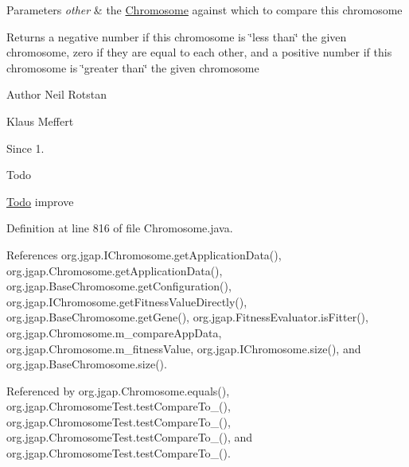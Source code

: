 \begin{DoxyParams}{Parameters}
{\em other} & the \hyperlink{classorg_1_1jgap_1_1_chromosome}{Chromosome} against which to compare this chromosome \\
\hline
\end{DoxyParams}
\begin{DoxyReturn}{Returns}
a negative number if this chromosome is \char`\"{}less than\char`\"{} the given chromosome, zero if they are equal to each other, and a positive number if this chromosome is \char`\"{}greater than\char`\"{} the given chromosome
\end{DoxyReturn}
\begin{DoxyAuthor}{Author}
Neil Rotstan 

Klaus Meffert 
\end{DoxyAuthor}
\begin{DoxySince}{Since}
1. 
\end{DoxySince}
\begin{DoxyRefDesc}{Todo}
\item[\hyperlink{todo__todo000052}{Todo}]improve \end{DoxyRefDesc}


Definition at line 816 of file Chromosome.\-java.



References org.\-jgap.\-I\-Chromosome.\-get\-Application\-Data(), org.\-jgap.\-Chromosome.\-get\-Application\-Data(), org.\-jgap.\-Base\-Chromosome.\-get\-Configuration(), org.\-jgap.\-I\-Chromosome.\-get\-Fitness\-Value\-Directly(), org.\-jgap.\-Base\-Chromosome.\-get\-Gene(), org.\-jgap.\-Fitness\-Evaluator.\-is\-Fitter(), org.\-jgap.\-Chromosome.\-m\-\_\-compare\-App\-Data, org.\-jgap.\-Chromosome.\-m\-\_\-fitness\-Value, org.\-jgap.\-I\-Chromosome.\-size(), and org.\-jgap.\-Base\-Chromosome.\-size().



Referenced by org.\-jgap.\-Chromosome.\-equals(), org.\-jgap.\-Chromosome\-Test.\-test\-Compare\-To\-\_(), org.\-jgap.\-Chromosome\-Test.\-test\-Compare\-To\-\_(), org.\-jgap.\-Chromosome\-Test.\-test\-Compare\-To\-\_(), and org.\-jgap.\-Chromosome\-Test.\-test\-Compare\-To\-\_().




